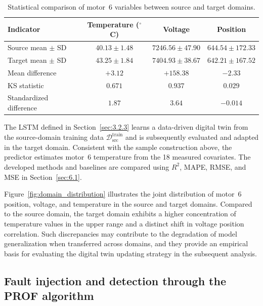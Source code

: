 \documentclass[a4paper,10pt]{cas-sc}%
\newcommand{\rev}[1]{\textcolor{revisionred}{#1}}
\begin{document}
\begin{table}[pos=htbp]
	\centering
	\color{revisionred}
	\caption{\color{revisionred}Statistical comparison of motor~6 variables between source and target domains.}
	\label{tab:domain_shift}
	\begin{tabular}{lccc}
		\toprule
		Indicator               & Temperature ($^\circ$C) & Voltage           & Position          \\
		\midrule
		Source mean $\pm$ SD    & $40.13\pm1.48$          & $7246.56\pm47.90$ & $644.54\pm172.33$ \\
		Target mean $\pm$ SD    & $43.25\pm1.84$          & $7404.93\pm38.67$ & $642.21\pm167.52$ \\
		Mean difference         & $+3.12$                 & $+158.38$         & $-2.33$           \\
		KS statistic            & $0.671$                 & $0.937$           & $0.029$           \\
		Standardized difference & $1.87$                  & $3.64$            & $-0.014$          \\
		\bottomrule
	\end{tabular}
\end{table}

\rev{The LSTM defined in Section~\ref{sec:3.2.3} learns a data-driven digital twin from the source-domain training data $\mathcal{D}_{\text{src}}^{\text{train}}$ and is subsequently evaluated and adapted in the target domain. Consistent with the sample construction above, the predictor estimates motor~6 temperature from the 18 measured covariates. The developed methods and baselines are compared using $R^2$, MAPE, RMSE, and MSE in Section~\ref{sec:6.1}.}

Figure~\ref{fig:domain_distribution} illustrates the joint distribution of motor~6 position, voltage, and temperature in the source and target domains. Compared to the source domain, the target domain exhibits a higher concentration of temperature values in the upper range and a distinct shift in voltage position correlation. Such discrepancies may contribute to the degradation of model generalization when transferred across domains, and they provide an empirical basis for evaluating the digital twin updating strategy in the subsequent analysis.

%
%
\subsection{Fault injection and detection through the PROF algorithm}\label{sec:5.3}
\end{document}
